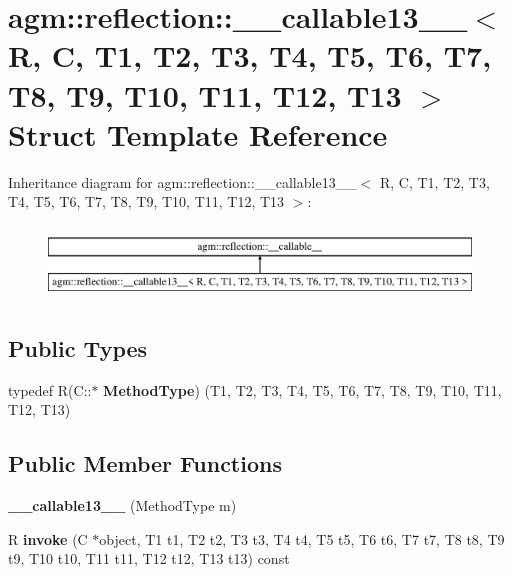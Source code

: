 \hypertarget{structagm_1_1reflection_1_1____callable13____}{}\section{agm\+:\+:reflection\+:\+:\+\_\+\+\_\+callable13\+\_\+\+\_\+$<$ R, C, T1, T2, T3, T4, T5, T6, T7, T8, T9, T10, T11, T12, T13 $>$ Struct Template Reference}
\label{structagm_1_1reflection_1_1____callable13____}
Inheritance diagram for agm\+:\+:reflection\+:\+:\+\_\+\+\_\+callable13\+\_\+\+\_\+$<$ R, C, T1, T2, T3, T4, T5, T6, T7, T8, T9, T10, T11, T12, T13 $>$\+:\begin{figure}[H]
\begin{center}
\leavevmode
\includegraphics[height=1.961471cm]{structagm_1_1reflection_1_1____callable13____}
\end{center}
\end{figure}
\subsection*{Public Types}
\begin{DoxyCompactItemize}
\item 
typedef R(C\+::$\ast$ {\bfseries Method\+Type}) (T1, T2, T3, T4, T5, T6, T7, T8, T9, T10, T11, T12, T13)\hypertarget{structagm_1_1reflection_1_1____callable13_____a2d7c1788f9d6f44323831bb302c53912}{}\label{structagm_1_1reflection_1_1____callable13_____a2d7c1788f9d6f44323831bb302c53912}

\end{DoxyCompactItemize}
\subsection*{Public Member Functions}
\begin{DoxyCompactItemize}
\item 
{\bfseries \+\_\+\+\_\+callable13\+\_\+\+\_\+} (Method\+Type m)\hypertarget{structagm_1_1reflection_1_1____callable13_____a6a2d72b6759a95648300ab3f038b02ee}{}\label{structagm_1_1reflection_1_1____callable13_____a6a2d72b6759a95648300ab3f038b02ee}

\item 
R {\bfseries invoke} (C $\ast$object, T1 t1, T2 t2, T3 t3, T4 t4, T5 t5, T6 t6, T7 t7, T8 t8, T9 t9, T10 t10, T11 t11, T12 t12, T13 t13) const \hypertarget{structagm_1_1reflection_1_1____callable13_____a5408f00df980817fca6d19a51126be9e}{}\label{structagm_1_1reflection_1_1____callable13_____a5408f00df980817fca6d19a51126be9e}

\end{DoxyCompactItemize}
